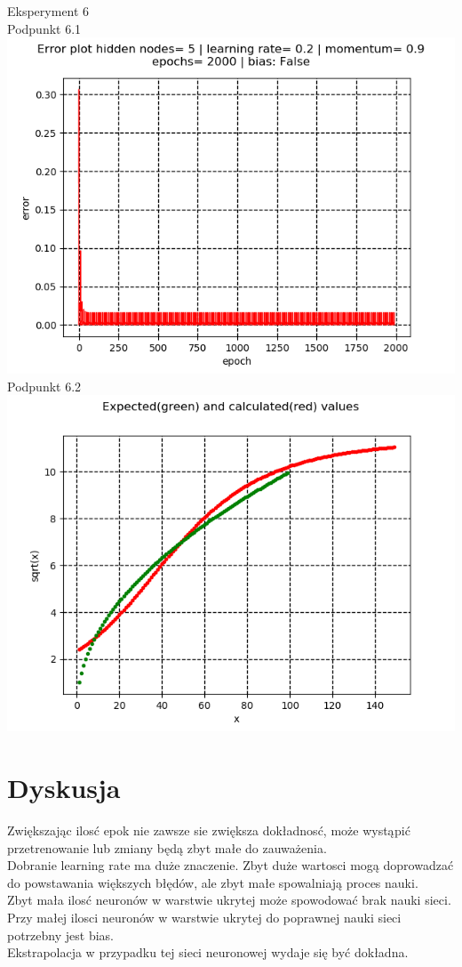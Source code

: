 \documentclass{classrep}
\begin{document}
{{Eksperyment 6\\
Podpunkt 6.1\\
\includegraphics[scale=0.8]{imgs/longer1.png}\\
Podpunkt 6.2\\
\includegraphics[scale=0.8]{imgs/longer2.png}\\


}




\section{Dyskusja}
{
Zwiększając ilosć epok nie zawsze sie zwiększa dokładnosć, może wystąpić przetrenowanie lub zmiany będą zbyt małe do zauważenia.\\
Dobranie learning rate ma duże znaczenie. 
Zbyt duże wartosci mogą doprowadzać do powstawania większych błędów, ale zbyt małe spowalniają proces nauki.\\
Zbyt mała ilosć neuronów w warstwie ukrytej może spowodować brak nauki sieci.\\
Przy małej ilosci neuronów w warstwie ukrytej do poprawnej nauki sieci potrzebny jest bias.\\
Ekstrapolacja w przypadku tej sieci neuronowej wydaje się być dokładna.
}

}
\end{document}
